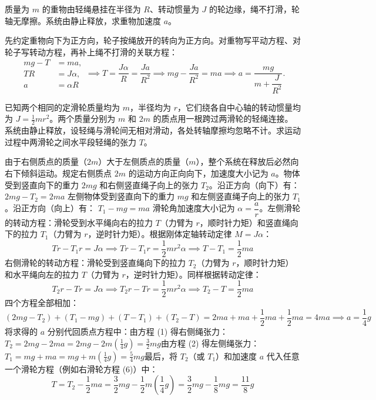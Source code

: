 \documentclass[lang=cn,11pt]{elegantbook}
\begin{document}
\begin{exercise}
质量为 \(m\) 的重物由轻绳悬挂在半径为 \(R\)、转动惯量为 \(J\) 的轮边缘，绳不打滑，轮轴无摩擦。系统由静止释放，求重物加速度 \(a\)。
\end{exercise}
\begin{solution}
先约定重物向下为正方向，轮子按绳放开的转向为正方向。对重物写平动方程、对轮子写转动方程，再补上绳不打滑的关联方程：
\[
\begin{aligned}
mg-T&=ma,\\
TR&=J\alpha,\\
a&=\alpha R
\end{aligned}
\implies
T=\frac{J\alpha}{R}=\frac{Ja}{R^2}
\implies
mg-\frac{Ja}{R^2}=ma
\implies
a=\frac{mg}{m+\dfrac{J}{R^2}}.
\]
\end{solution}

\begin{exercise}
已知两个相同的定滑轮质量均为 $m$，半径均为 $r$，它们绕各自中心轴的转动惯量均为 $J = \frac{1}{2}mr^2$。两个质量分别为 $m$ 和 $2m$ 的质点用一根跨过两滑轮的轻绳连接。系统由静止释放，设轻绳与滑轮间无相对滑动，各处转轴摩擦均忽略不计。求运动过程中两滑轮之间水平段轻绳的张力 $T$。
\end{exercise}
\begin{solution}
由于右侧质点的质量（$2m$）大于左侧质点的质量（$m$），整个系统在释放后必然向右下倾斜运动。规定右侧质点 $2m$ 的运动方向正向向下，加速度大小记为 $a$。物体受到竖直向下的重力 $2mg$ 和右侧竖直绳子向上的张力 $T_2$。沿正方向（向下）有： \(2mg - T_2 = 2ma\) 
左侧物体受到竖直向下的重力 $mg$ 和左侧竖直绳子向上的张力 $T_1$。沿正方向（向上）有： \(T_1 - mg = ma\) 
滑轮角加速度大小记为 $\alpha=\dfrac{a}{r}$。左侧滑轮的转动方程：滑轮受到水平绳向右的拉力 $T$（力臂为 $r$，顺时针力矩）和竖直绳向下的拉力 $T_1$（力臂为 $r$，逆时针力矩）。根据刚体定轴转动定律 $M = J\alpha$：
$$Tr - T_1r = J\alpha \implies Tr - T_1r = \frac{1}{2}mr^2\alpha\implies T - T_1 = \frac{1}{2}ma $$
右侧滑轮的转动方程：滑轮受到竖直绳向下的拉力 $T_2$（力臂为 $r$，顺时针力矩）和水平绳向左的拉力 $T$（力臂为 $r$，逆时针力矩）。同样根据转动定律：$$T_2r - Tr = J\alpha \implies T_2r - Tr = \frac{1}{2}mr^2\alpha\implies T_2 - T = \frac{1}{2}ma$$四个方程全部相加：$$(2mg - T_2) + (T_1 - mg) + (T - T_1) + (T_2 - T) = 2ma + ma + \frac{1}{2}ma + \frac{1}{2}ma=4ma\implies a = \frac{1}{4}g$$
将求得的 $a$ 分别代回质点方程中：由方程 (1) 得右侧绳张力：$T_2 = 2mg - 2ma = 2mg - 2m\left(\frac{1}{4}g\right) = \frac{3}{2}mg$由方程 (2) 得左侧绳张力：$T_1 = mg + ma = mg + m\left(\frac{1}{4}g\right) = \frac{5}{4}mg$最后，将 $T_2$（或 $T_1$）和加速度 $a$ 代入任意一个滑轮方程（例如右滑轮方程 (6)）中：$$T = T_2 - \frac{1}{2}ma = \frac{3}{2}mg - \frac{1}{2}m\left(\frac{1}{4}g\right) = \frac{3}{2}mg - \frac{1}{8}mg=\frac{11}{8}g$$
\end{solution}
\end{document}
